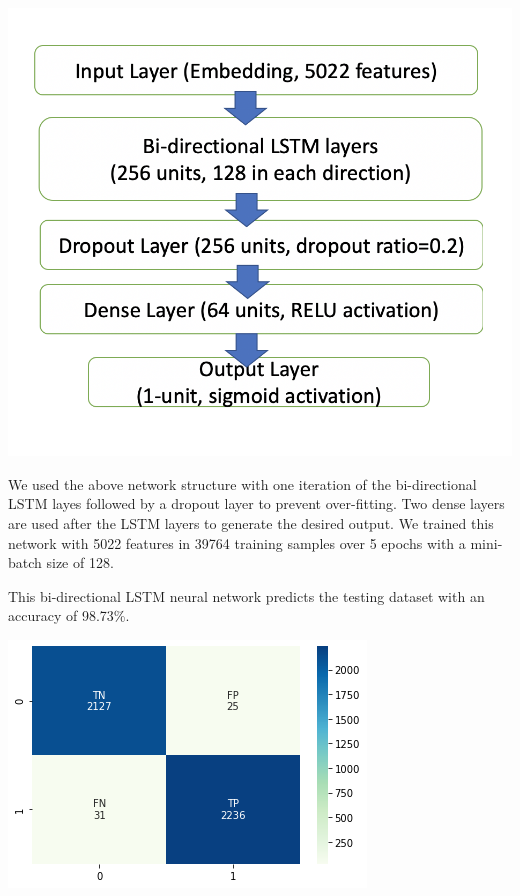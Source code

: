 \documentclass{article}
\begin{document}
\begin{multicols}{2}
\begin{center}
\includegraphics[scale=0.3]{images/img5.png}
\end{center}

We used the above network structure with one iteration of the bi-directional LSTM layes followed by a dropout layer to prevent over-fitting. Two dense layers are used after the LSTM layers to generate the desired output. We trained this network with 5022 features in 39764 training samples over 5 epochs with a mini-batch size of 128.


This bi-directional LSTM neural network predicts the testing dataset with an accuracy of 98.73\%.

\begin{center}
\includegraphics[scale=0.4]{images/lstmcm.png}
\end{center}


\end{multicols}
\end{document}
